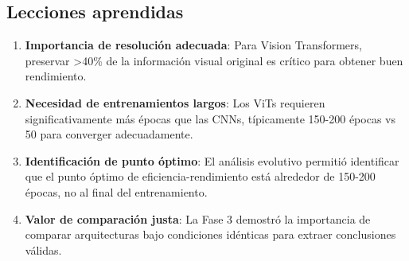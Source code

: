 \subsection{Lecciones aprendidas}

\begin{enumerate}
    \item \textbf{Importancia de resolución adecuada}: Para Vision Transformers, preservar >40\% de la información visual original es crítico para obtener buen rendimiento.
    
    \item \textbf{Necesidad de entrenamientos largos}: Los ViTs requieren significativamente más épocas que las CNNs, típicamente 150-200 épocas vs 50 para converger adecuadamente.
    
    \item \textbf{Identificación de punto óptimo}: El análisis evolutivo permitió identificar que el punto óptimo de eficiencia-rendimiento está alrededor de 150-200 épocas, no al final del entrenamiento.
    
    \item \textbf{Valor de comparación justa}: La Fase 3 demostró la importancia de comparar arquitecturas bajo condiciones idénticas para extraer conclusiones válidas.
\end{enumerate}
